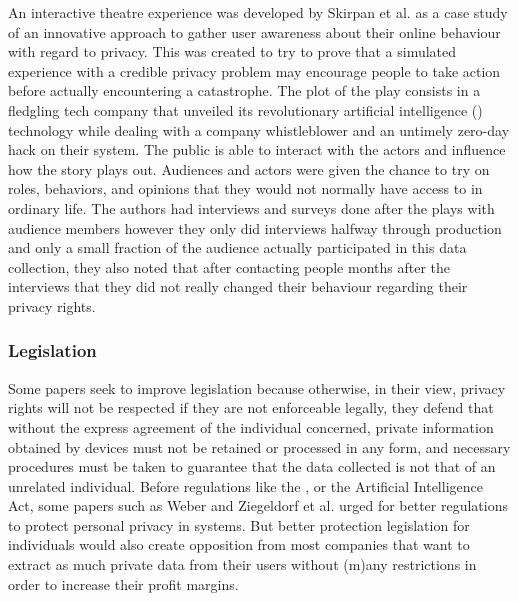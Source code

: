 An interactive theatre experience was developed by Skirpan et al. \cite{SkirpanPrivacy}
as a case study of an innovative approach to gather user awareness about their
online behaviour with regard to privacy. This was created to try to prove
that a simulated experience with a credible privacy problem may encourage
people to take action before actually encountering a catastrophe. The plot
of the play consists in a fledgling tech company that unveiled its revolutionary
artificial intelligence (\hyperlink{\acronym}{\acronym}) technology while dealing with a company whistleblower and an untimely
zero-day hack on their system. The public is able to interact with the actors
and influence how the story plays out. Audiences and actors were given the
chance to try on roles, behaviors, and opinions that they would not normally
have access to in ordinary life. The authors had interviews and surveys
done after the plays with audience members however they only did interviews
halfway through production and only a small fraction of the audience actually
participated in this data collection, they also noted that after contacting
people months after the interviews that they did not really changed their
behaviour regarding their privacy rights.

\subsubsection{Legislation}

Some papers seek to improve legislation \cite{WEBER2015618, FabianoInternet}
because otherwise, in their view, privacy rights will not be respected if they
are not enforceable legally, they defend that without the express agreement
of the individual concerned, private information obtained by \hyperlink{\acronym}{\acronym} devices
must not be retained or processed in any form, and necessary procedures
must be taken to guarantee that the data collected is not that of an unrelated
individual. Before regulations like the \hyperlink{\acronym}{\acronym}, \hyperlink{\acronym}{\acronym} or the Artificial Intelligence
Act, some papers such as Weber \cite{weber2010internet} and Ziegeldorf et al. \cite{ziegeldorf2014privacy}
urged for better regulations to protect personal privacy in \hyperlink{\acronym}{\acronym} systems.
But better protection legislation for individuals would also create opposition
from most companies that want to extract as much private data from their
users without (m)any restrictions in order to increase their profit margins.

